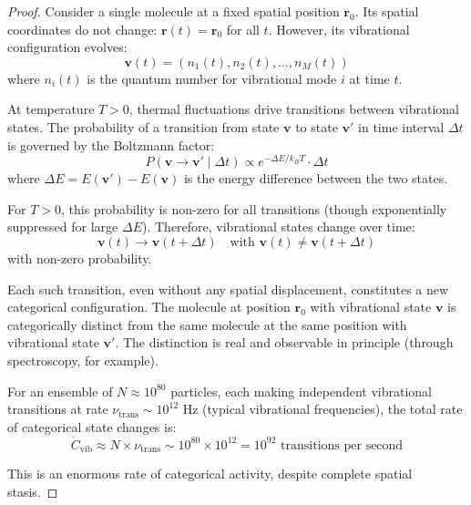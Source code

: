 \documentclass[12pt,a4paper]{article}
\theoremstyle{definition}
\theoremstyle{remark}
\begin{document}
\begin{proof}
Consider a single molecule at a fixed spatial position $\mathbf{r}_0$. Its spatial coordinates do not change: $\mathbf{r}(t) = \mathbf{r}_0$ for all $t$. However, its vibrational configuration evolves:
\begin{equation}
\mathbf{v}(t) = (n_1(t), n_2(t), \ldots, n_M(t))
\end{equation}
where $n_i(t)$ is the quantum number for vibrational mode $i$ at time $t$.

At temperature $T > 0$, thermal fluctuations drive transitions between vibrational states. The probability of a transition from state $\mathbf{v}$ to state $\mathbf{v}'$ in time interval $\Delta t$ is governed by the Boltzmann factor:
\begin{equation}
P(\mathbf{v} \to \mathbf{v}' \mid \Delta t) \propto e^{-\Delta E / k_B T} \cdot \Delta t
\end{equation}
where $\Delta E = E(\mathbf{v}') - E(\mathbf{v})$ is the energy difference between the two states.

For $T > 0$, this probability is non-zero for all transitions (though exponentially suppressed for large $\Delta E$). Therefore, vibrational states change over time:
\begin{equation}
\mathbf{v}(t) \to \mathbf{v}(t + \Delta t) \quad \text{with } \mathbf{v}(t) \neq \mathbf{v}(t + \Delta t)
\end{equation}
with non-zero probability.

Each such transition, even without any spatial displacement, constitutes a new categorical configuration. The molecule at position $\mathbf{r}_0$ with vibrational state $\mathbf{v}$ is categorically distinct from the same molecule at the same position with vibrational state $\mathbf{v}'$. The distinction is real and observable in principle (through spectroscopy, for example).

For an ensemble of $N \approx 10^{80}$ particles, each making independent vibrational transitions at rate $\nu_{\text{trans}} \sim 10^{12}$ Hz (typical vibrational frequencies), the total rate of categorical state changes is:
\begin{equation}
\dot{C}_{\text{vib}} \approx N \times \nu_{\text{trans}} \sim 10^{80} \times 10^{12} = 10^{92} \text{ transitions per second}
\end{equation}

This is an enormous rate of categorical activity, despite complete spatial stasis.
\end{proof}
\end{document}
